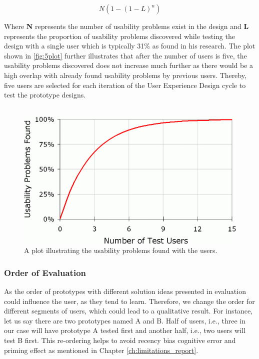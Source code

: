 \[ N (1-(1- L )^n ) \]

Where \textbf{N} represents the number of usability problems exist in the design and \textbf{L} represents the proportion of usability problems discovered while testing the design with a single user which is typically 31\% as found in his research. \cite{5users} The plot shown in \autoref{fig:5plot} further illustrates that after the number of users is five, the usability problems discovered does not increase much further as there would be a high overlap with already found usability problems by previous users. Thereby, five users are selected for each iteration of the User Experience Design cycle to test the prototype designs. \\ \\

\begin{figure}[hbt!]
	\centering
	\includegraphics[width=\linewidth]{figures/fiveplot}
	\caption{A plot illustrating the usability problems found with the users.\cite{5users}}
	\label{fig:5plot}
\end{figure}

\subsubsection{Order of Evaluation}

As the order of prototypes with different solution ideas presented in evaluation could influence the user, as they tend to learn. Therefore, we change the order for different segments of users, which could lead to a qualitative result. For instance, let us say there are two prototypes named A and B. Half of users, i.e., three in our case will have prototype A tested first and another half, i.e., two users will test B first. This re-ordering helps to avoid recency bias cognitive error and priming effect as mentioned in Chapter \ref{ch:limitations_report}. \\

